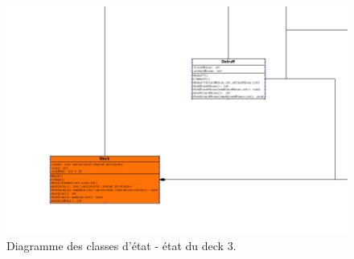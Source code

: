 \begin{landscape}
\begin{figure}[p]
\includegraphics[width=0.8\paperheight]{images/state7.png}
\caption{\label{uml:state}Diagramme des classes d'état - état du deck 3.} 
\end{figure}
\end{landscape}


\clearpage
